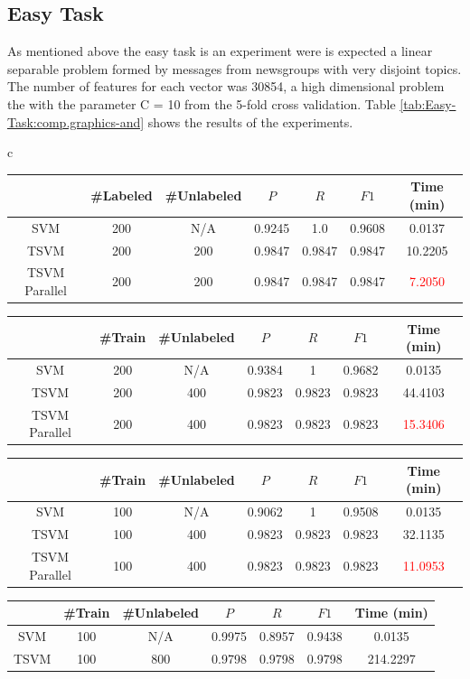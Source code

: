 \subsection{Easy Task}

As mentioned above the easy task is an experiment were is expected
a linear separable problem formed by messages from newsgroups with
very disjoint topics. The number of features for each vector was 30854,
a high dimensional problem the with the parameter C = 10 from the
5-fold cross validation. Table \ref{tab:Easy-Task:comp.graphics-and}
shows the results of the experiments. 

%
\begin{table}
\begin{longtable}{c}
\begin{tabular}{|c|c|c|c|c|c||c|}
\hline 
 & \#Labeled & \#Unlabeled & $P$  & $R$  & $F1$  & Time (min)\tabularnewline
\hline
\hline 
SVM & 200 & N/A & 0.9245 & 1.0 & 0.9608 & 0.0137\tabularnewline
\hline 
TSVM & 200 & 200 & 0.9847 & 0.9847 & 0.9847 & 10.2205\tabularnewline
\hline 
TSVM Parallel & 200 & 200 & 0.9847 & 0.9847 & 0.9847 & \textcolor{red}{7.2050}\tabularnewline
\hline
\end{tabular}\tabularnewline
\tabularnewline
\begin{tabular}{|c|c|c|c|c|c||c|}
\hline 
 & \#Train & \#Unlabeled & $P$  & $R$  & $F1$  & Time (min)\tabularnewline
\hline 
SVM & 200 & N/A & 0.9384 & 1 & 0.9682 & 0.0135\tabularnewline
\hline 
TSVM & 200 & 400 & 0.9823 & 0.9823 & 0.9823 & 44.4103\tabularnewline
\hline 
TSVM Parallel & 200 & 400 & 0.9823 & 0.9823 & 0.9823 & \textcolor{red}{15.3406}\tabularnewline
\hline
\end{tabular}\tabularnewline
\tabularnewline
\tabularnewline
\begin{tabular}{|c|c|c|c|c|c||c|}
\hline 
 & \#Train & \#Unlabeled & $P$  & $R$  & $F1$  & Time (min)\tabularnewline
\hline 
SVM & 100 & N/A & 0.9062 & 1 & 0.9508 & 0.0135\tabularnewline
\hline 
TSVM & 100 & 400 & 0.9823 & 0.9823 & 0.9823 & 32.1135\tabularnewline
\hline 
TSVM Parallel & 100 & 400 & 0.9823 & 0.9823 & 0.9823 & \textcolor{red}{11.0953}\tabularnewline
\hline
\end{tabular}\tabularnewline
\tabularnewline
\begin{tabular}{|c|c|c|c|c|c||c|}
\hline 
 & \#Train & \#Unlabeled & $P$  & $R$  & $F1$  & Time (min)\tabularnewline
\hline
\hline 
SVM & 100 & N/A & 0.9975 & 0.8957 & 0.9438 & 0.0135\tabularnewline
\hline 
TSVM & 100 & 800 & 0.9798 & 0.9798 & 0.9798 & 214.2297\tabularnewline

\end{tabular}
\end{longtable}
\end{table}
